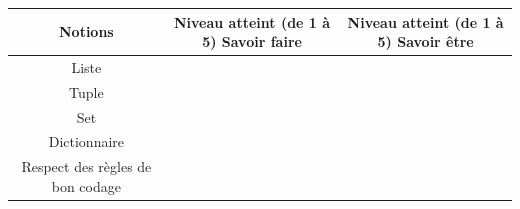 \begin{table}[H]
    \centering
    \begin{tabular}{|c|c|c|} \hline
        \textbf{Notions} & \textbf{Niveau atteint} (de 1 à 5) \textbf{Savoir faire}  & \textbf{Niveau atteint} (de 1 à 5) \textbf{Savoir être}\\\hline
        Liste & & \\\hline
        Tuple &&\\\hline
        Set &&\\\hline
        Dictionnaire &&\\\hline
        Respect des règles de bon codage && \\\hline
    \end{tabular}
\end{table}


